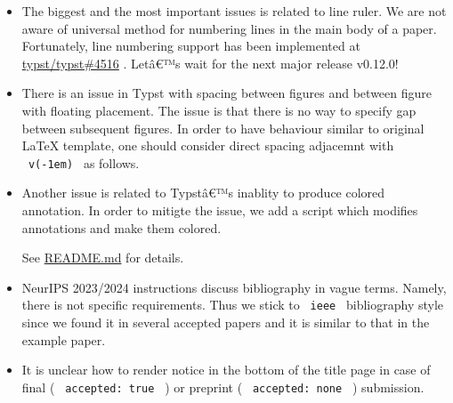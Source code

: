 \begin{itemize}
\item
  The biggest and the most important issues is related to line ruler. We
  are not aware of universal method for numbering lines in the main body
  of a paper. Fortunately, line numbering support has been implemented
  at \href{https://github.com/typst/typst/pull/4516}{typst/typst\#4516}
  . Letâ€™s wait for the next major release v0.12.0!
\item
  There is an issue in Typst with spacing between figures and between
  figure with floating placement. The issue is that there is no way to
  specify gap between subsequent figures. In order to have behaviour
  similar to original LaTeX template, one should consider direct spacing
  adjacemnt with \texttt{\ v(-1em)\ } as follows.

\begin{Shaded}
\begin{Highlighting}[]
\NormalTok{)}
\NormalTok{)}
\end{Highlighting}
\end{Shaded}
\item
  Another issue is related to Typstâ€™s inablity to produce colored
  annotation. In order to mitigte the issue, we add a script which
  modifies annotations and make them colored.

\begin{Shaded}
\begin{Highlighting}[]
\end{Highlighting}
\end{Shaded}

  See
  \href{https://github.com/daskol/typst-templates/\#colored-annotations}{README.md}
  for details.
\item
  NeurIPS 2023/2024 instructions discuss bibliography in vague terms.
  Namely, there is not specific requirements. Thus we stick to
  \texttt{\ ieee\ } bibliography style since we found it in several
  accepted papers and it is similar to that in the example paper.
\item
  It is unclear how to render notice in the bottom of the title page in
  case of final ( \texttt{\ accepted:\ true\ } ) or preprint (
  \texttt{\ accepted:\ none\ } ) submission.
\end{itemize}


